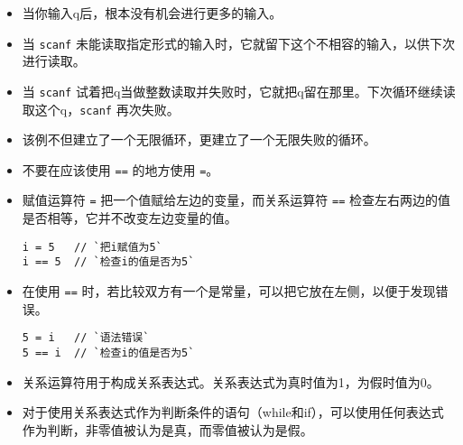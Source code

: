 \begin{frame}[fragile]
\begin{itemize}
\item
当你输入q后，根本没有机会进行更多的输入。\\[0.1in]
\item
当 \lstinline|scanf| 未能读取指定形式的输入时，它就留下这个不相容的输入，以供下次进行读取。\\[0.1in]
\item
当 \lstinline|scanf| 试着把q当做整数读取并失败时，它就把q留在那里。下次循环继续读取这个q，\lstinline|scanf| 再次失败。\\[0.1in]
\item
该例不但建立了一个无限循环，更建立了一个无限失败的循环。
\end{itemize}
\end{frame}


\begin{frame}[fragile]
\begin{itemize}
\item
不要在应该使用 \lstinline|==| 的地方使用 \lstinline|=|。\\[0.1in]
\item
  赋值运算符 \lstinline|=| 把一个值赋给左边的变量，而关系运算符 \lstinline|==| 检查左右两边的值是否相等，它并不改变左边变量的值。
\begin{lstlisting}
i = 5   // `把i赋值为5`
i == 5  // `检查i的值是否为5`
\end{lstlisting}
\item
  在使用 \lstinline|==| 时，若比较双方有一个是常量，可以把它放在左侧，以便于发现错误。
\begin{lstlisting}
5 = i   // `语法错误`
5 == i  // `检查i的值是否为5`
\end{lstlisting}
\end{itemize}
\end{frame}


\begin{frame}[fragile]
\begin{itemize}
\item 关系运算符用于构成关系表达式。关系表达式为真时值为1，为假时值为0。\\[0.1in]
\item 对于使用关系表达式作为判断条件的语句（while和if），可以使用任何表达式作为判断，非零值被认为是真，而零值被认为是假。
\end{itemize}
\end{frame}


